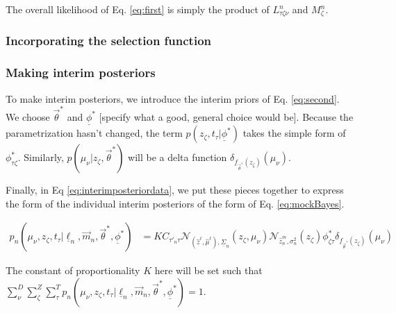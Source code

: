 \documentclass[12pt, onecolumn]{emulateapj}
\newcommand{\textul}{\underline}
\begin{document}
The overall likelihood of Eq. \ref{eq:first} is simply the product of $L^{n}_{\tau\zeta\nu}$ and $M^{n}_{\zeta}$.

\subsubsection{Incorporating the selection function}
\label{sec:selection}

\subsubsection{Making interim posteriors}
\label{sec:posteriors}

To make interim posteriors, we introduce the interim priors of Eq. \ref{eq:second}.  We choose $\vec{\theta}^{*}$ and $\textul{\phi}^{*}$ [specify what a good, general choice would be].  Because the parametrization hasn't changed, the term $p(z_{\zeta}, t_{\tau} | \textul{\phi}^{*})$ takes the simple form of $\phi^{*}_{\tau\zeta}$.  Similarly, $p(\mu_{\nu} | z_{\zeta}, \vec{\theta}^{*})$ will be a delta function $\delta_{f_{\vec{\theta}^{*}}(z_{\zeta})}(\mu_{\nu})$.  

Finally, in Eq \ref{eq:interimposteriordata}, we put these pieces together to express the form of the individual interim posteriors of the form of Eq. \ref{eq:mockBayes}.

\begin{align}
\label{eq:interimposteriordata}
p_{n}(\mu_{\nu}, z_{\zeta}, t_{\tau} | \textul{\ell}_{n}, \vec{m}_{n}, \vec{\theta}^{*}, \textul{\phi}^{*}) &= KC_{\tau'_{n}\tau}\mathcal{N}_{(\hat{z}^{\ell}, \hat{\mu}^{\ell}), \textul{\Sigma}_{n}}(z_{\zeta}, \mu_{\nu}) \mathcal{N}_{\hat{z}_{n}^{m}, \sigma_{n}^{2}}(z_{\zeta}) \phi^{*}_{\zeta\tau}\delta_{f_{\vec{\theta}^{*}}(z_{\zeta})}(\mu_{\nu})
\end{align}

The constant of proportionality $K$ here will be set such that $\sum_{\nu}^{D}\sum_{\zeta}^{Z}\sum_{\tau}^{T} p_{n}(\mu_{\nu}, z_{\zeta}, t_{\tau} | \textul{\ell}_{n}, \vec{m}_{n}, \vec{\theta}^{*}, \textul{\phi}^{*})=1$.
\end{document}
